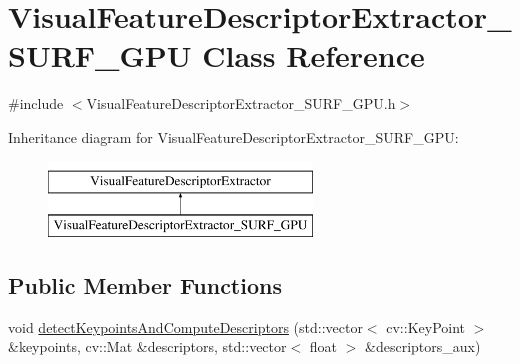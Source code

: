 \hypertarget{class_visual_feature_descriptor_extractor___s_u_r_f___g_p_u}{
\section{VisualFeatureDescriptorExtractor\_\-SURF\_\-GPU Class Reference}
\label{class_visual_feature_descriptor_extractor___s_u_r_f___g_p_u}
}


{\ttfamily \#include $<$VisualFeatureDescriptorExtractor\_\-SURF\_\-GPU.h$>$}

Inheritance diagram for VisualFeatureDescriptorExtractor\_\-SURF\_\-GPU:\begin{figure}[H]
\begin{center}
\leavevmode
\includegraphics[height=2.000000cm]{class_visual_feature_descriptor_extractor___s_u_r_f___g_p_u}
\end{center}
\end{figure}
\subsection*{Public Member Functions}
\begin{DoxyCompactItemize}
\item 
void \hyperlink{class_visual_feature_descriptor_extractor___s_u_r_f___g_p_u_aef7ddf1d1e42267ba7b5d06a0a36e58f}{detectKeypointsAndComputeDescriptors} (std::vector$<$ cv::KeyPoint $>$ \&keypoints, cv::Mat \&descriptors, std::vector$<$ float $>$ \&descriptors\_\-aux)
\end{DoxyCompactItemize}
